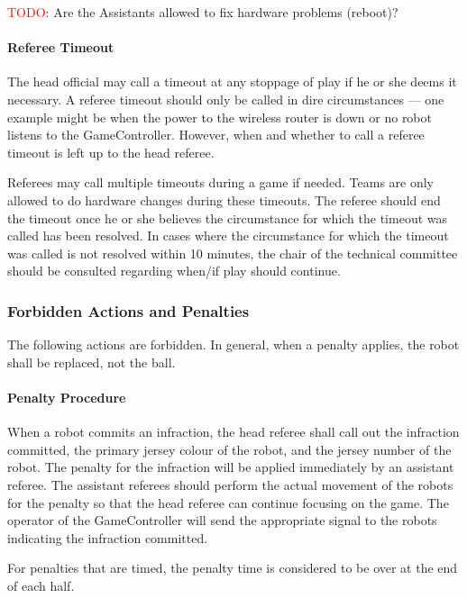\textcolor{red}{TODO}: Are the Assistants allowed to fix hardware problems (\ie reboot)?

\paragraph{Referee Timeout}
\label{sec:referee_timeout}
The head official may call a timeout at any stoppage of play if he or she deems it necessary. A referee timeout should only be called in dire circumstances --- one example might be when the power to the wireless router is down or no robot listens to the GameController. However, when and whether to call a referee timeout is left up to the head referee.

Referees may call multiple timeouts during a game if needed. Teams are only allowed to do hardware changes during these timeouts.  The referee should end the timeout once he or she believes the circumstance for which the timeout was called has been resolved.  In cases where the circumstance for which the timeout was called is not resolved within 10 minutes, the chair of the technical committee should be consulted regarding when/if play should continue.

\newpage

\subsubsection{Forbidden Actions and Penalties}
\label{sec:forbidden_act}

The following actions are forbidden. In general, when a penalty applies, the robot shall be replaced, not the ball.

\paragraph{Penalty Procedure}
\label{sec:penalty_procedure}

When a robot commits an infraction, the head referee shall call out the infraction committed, the primary jersey colour of the robot, and the jersey number of the robot. The penalty for the infraction will be applied immediately by an assistant referee. The assistant referees should perform the actual movement of the robots for the penalty so that the head referee can continue focusing on the game. The operator of the GameController will send the appropriate signal to the robots indicating the infraction committed.

For penalties that are timed, the penalty time is considered to be over at the end of each half.

